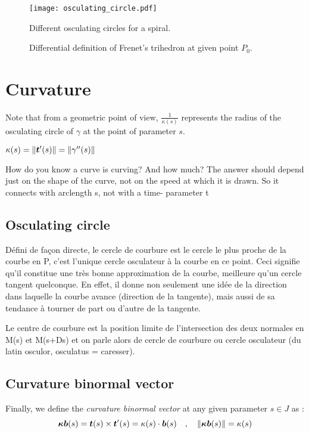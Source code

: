 \begin{figure}[t] 
\begin{center}
\texttt{[image: osculating\_circle.pdf]} 
\caption{Different osculating circles for a spiral.}
\label{fig:3_1}
\end{center}
\end{figure}

\begin{figure}[h]
     \centering
     \caption{Differential definition of Frenet's trihedron at given point $P_0$.}
     \label{}
\end{figure}

\section{Curvature}

Note that from a geometric point of view, $\frac{1}{\kappa(s)}$ represents the radius of the osculating circle of $\gamma$ at the point of parameter $s$.

$\kappa(s) = \|\boldsymbol{t}'(s)\| = \|\gamma''(s)\|$


How do you know a curve is curving?  
And how much? 
The answer should depend just on the 
shape of the curve, not on the speed at 
which it is drawn.  
So it connects with 
arclength s, not with a time-
parameter t

\subsection{Osculating circle}
Défini de façon directe, le cercle de courbure est le cercle le plus proche de la courbe en P, c'est l'unique cercle osculateur à la courbe en ce point. Ceci signifie qu'il constitue une très bonne approximation de la courbe, meilleure qu'un cercle tangent quelconque. En effet, il donne non seulement une idée de la direction dans laquelle la courbe avance (direction de la tangente), mais aussi de sa tendance à tourner de part ou d'autre de la tangente.

Le centre de courbure est la position limite de l'intersection des deux normales en M(s) et M(s+Ds) et on parle alors de cercle de courbure ou cercle osculateur (du latin osculor, osculatus = caresser). 

\subsection{Curvature binormal vector}
Finally, we define the \emph{curvature binormal vector} at any given parameter $s \in J$ as :
\begin{equation}
\boldsymbol{\kappa b}(s) = \boldsymbol{t}(s) \times \boldsymbol{t}'(s) = \kappa(s)\cdot\boldsymbol{b}(s)
\quad,\quad
\|\boldsymbol{\kappa b}(s)\|= \kappa(s)
\end{equation}

